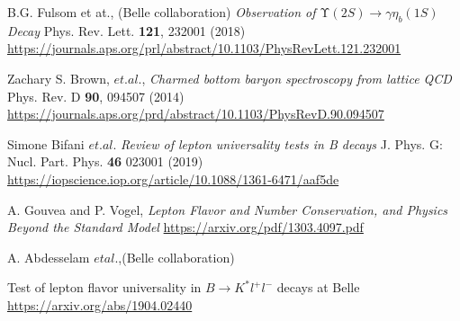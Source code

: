 \documentclass{article}
\begin{document}
\begin{thebibliography}{9}
B.G. Fulsom et at., (Belle collaboration)
\textit{Observation of $\mathrm{\ensuremath{\Upsilon}}(2S)\ensuremath{\rightarrow}\ensuremath{\gamma}{\ensuremath{\eta}}_{b}(1S)$ Decay}
Phys. Rev. Lett. \textbf{121}, 232001 (2018)
\url{https://journals.aps.org/prl/abstract/10.1103/PhysRevLett.121.232001}

Zachary S. Brown, $et. al.$,
\textit{Charmed bottom baryon spectroscopy from lattice QCD}
Phys. Rev. D \textbf{90}, 094507 (2014)
\url{https://journals.aps.org/prd/abstract/10.1103/PhysRevD.90.094507}

Simone Bifani $et. al.$ 
\textit{Review of lepton universality tests in B decays}
J. Phys. G: Nucl. Part. Phys. \textbf{46} 023001 (2019)
\url{https://iopscience.iop.org/article/10.1088/1361-6471/aaf5de}

A. Gouvea and P. Vogel,
\textit{Lepton Flavor and Number Conservation, and Physics Beyond the Standard Model}
\url{https://arxiv.org/pdf/1303.4097.pdf}

A. Abdesselam $et al.$,(Belle collaboration)
\item{Test of lepton flavor universality in $B\rightarrow K^{*}l^{+}l^{-}$ decays at Belle}
\url{https://arxiv.org/abs/1904.02440}




\end{thebibliography}
\end{document}
